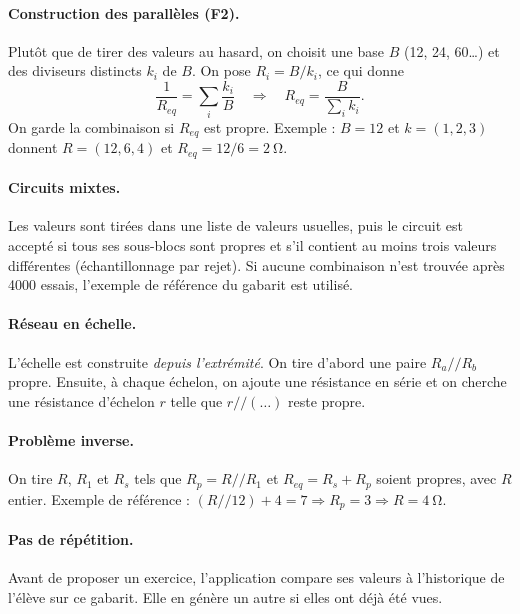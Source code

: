 \documentclass[11pt,a4paper]{report}
\newcommand{\req}{R_{eq}}
\newcommand{\para}{\mathbin{/\!/}}
\begin{document}
\paragraph{Construction des parallèles (F2).} Plutôt que de tirer des valeurs au hasard, on choisit une base $B$ (12, 24, 60…) et des diviseurs distincts $k_i$ de $B$. On pose $R_i = B/k_i$, ce qui donne
\begin{equation}
  \frac{1}{\req} = \sum_i \frac{k_i}{B}
  \quad\Longrightarrow\quad
  \req = \frac{B}{\sum_i k_i}.
\end{equation}
On garde la combinaison si $\req$ est propre. Exemple : $B = 12$ et $k = (1,2,3)$ donnent $R = (12, 6, 4)$ et $\req = 12/6 = \SI{2}{\ohm}$.

\paragraph{Circuits mixtes.} Les valeurs sont tirées dans une liste de valeurs usuelles, puis le circuit est accepté si tous ses sous-blocs sont propres et s'il contient au moins trois valeurs différentes (échantillonnage par rejet). Si aucune combinaison n'est trouvée après 4000 essais, l'exemple de référence du gabarit est utilisé.

\paragraph{Réseau en échelle.} L'échelle est construite \emph{depuis l'extrémité}. On tire d'abord une paire $R_a \para R_b$ propre. Ensuite, à chaque échelon, on ajoute une résistance en série et on cherche une résistance d'échelon $r$ telle que $r \para (\dots)$ reste propre.

\paragraph{Problème inverse.} On tire $R$, $R_1$ et $R_s$ tels que $R_p = R \para R_1$ et $\req = R_s + R_p$ soient propres, avec $R$ entier. Exemple de référence : $(R \para 12) + 4 = 7 \Rightarrow R_p = 3 \Rightarrow R = \SI{4}{\ohm}$.

\paragraph{Pas de répétition.} Avant de proposer un exercice, l'application compare ses valeurs à l'historique de l'élève sur ce gabarit. Elle en génère un autre si elles ont déjà été vues.
\end{document}
